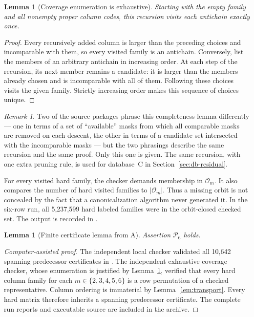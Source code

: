 \documentclass[11pt,letterpaper]{article}
\numberwithin{equation}{section}
\newtheorem{lemma}[theorem]{Lemma}
\theoremstyle{definition}
\theoremstyle{remark}
\newtheorem{remark}[theorem]{Remark}
\newcommand{\code}[1]{\texttt{\detokenize{#1}}}
\newcommand{\dbA}{\textsf{A}}
\newcommand{\dbC}{\textsf{C}}
\begin{document}
\begin{lemma}[Coverage enumeration is exhaustive]\label{lem:enumeration}
Starting with the empty family and all nonempty proper column codes, this
recursion visits each antichain exactly once.
\end{lemma}
\begin{proof}
Every recursively added column is larger than the preceding choices and
incomparable with them, so every visited family is an antichain. Conversely,
list the members of an arbitrary antichain in increasing order. At each
step of the recursion, its next member remains a candidate: it is larger
than the members already chosen and is incomparable with all of them.
Following these choices visits the given family. Strictly increasing order
makes this sequence of choices unique.
\end{proof}

\begin{remark}
Two of the source packages phrase this completeness lemma differently --- one
in terms of a set of ``available'' masks from which all comparable masks are
removed on each descent, the other in terms of a candidate set intersected
with the incomparable masks --- but the two phrasings describe the same
recursion and the same proof. Only this one is given. The same recursion,
with one extra pruning rule, is used for database~\dbC{} in
Section~\ref{sec:db-residual}.
\end{remark}

For every visited hard family, the checker demands membership in
$\mathcal O_m$. It also compares the number of hard visited families to
$|\mathcal O_m|$. Thus a missing orbit is not concealed by the fact that
a canonicalization algorithm never generated it. In the six-row run,
all 5,237,599 hard labeled families were in the orbit-closed checked set.
The output is recorded in \code{audit/coverage.json}.

\begin{lemma}[Finite certificate lemma from \dbA{}]\label{lem:P6}
Assertion $\mathcal P_6$ holds.
\end{lemma}
\begin{proof}[Computer-assisted proof]
The independent local checker validated all 10,642 spanning predecessor
certificates in \code{data/certificates.jsonl}. The independent exhaustive
coverage checker, whose enumeration is justified by
Lemma~\ref{lem:enumeration}, verified that every hard column family for
each $m\in\{2,3,4,5,6\}$ is a row permutation of a checked representative.
Column ordering is immaterial by Lemma~\ref{lem:transport}. Every hard
matrix therefore inherits a spanning predecessor certificate. The complete
run reports and executable source are included in the archive.
\end{proof}
\end{document}
